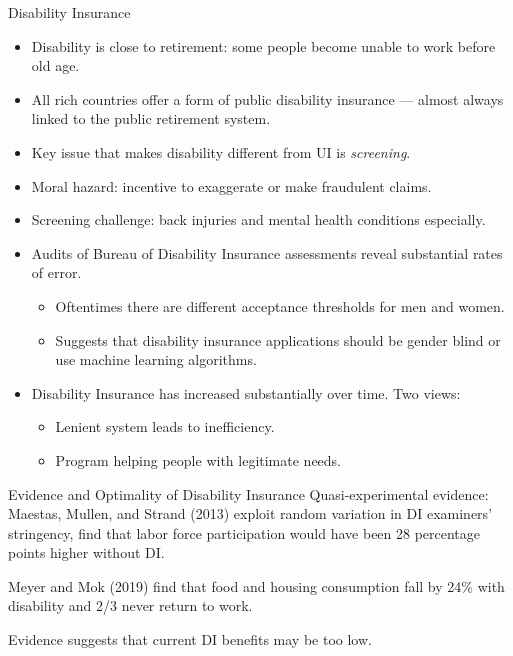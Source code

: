 \documentclass[8pt]{extarticle}
\begin{document}
  \begin{problem}{Disability Insurance}
    \begin{itemize}
      \item Disability is close to retirement: some people become unable to work before old age.
      \item All rich countries offer a form of public disability insurance --- almost always linked to the public retirement system.
      \item Key issue that makes disability different from UI is \textit{screening}.
      \item Moral hazard: incentive to exaggerate or make fraudulent claims.
      \item Screening challenge: back injuries and mental health conditions especially.
      \item Audits of Bureau of Disability Insurance assessments reveal substantial rates of error.
        \begin{itemize}
          \item Oftentimes there are different acceptance thresholds for men and women.
          \item Suggests that disability insurance applications should be gender blind or use machine learning algorithms. 
        \end{itemize}
      \item Disability Insurance has increased substantially over time. Two views:
        \begin{itemize}
          \item Lenient system leads to inefficiency.
          \item Program helping people with legitimate needs.
        \end{itemize}
    \end{itemize}
  \end{problem}
  \begin{problem}{Evidence and Optimality of Disability Insurance}
    Quasi-experimental evidence: Maestas, Mullen, and Strand (2013) exploit random variation in DI examiners' stringency, find that labor force participation would have been 28 percentage points higher without DI.\newline

    Meyer and Mok (2019) find that food and housing consumption fall by 24\% with disability and 2/3 never return to work.\newline

    Evidence suggests that current DI benefits may be too low.
  \end{problem}
\end{document}
